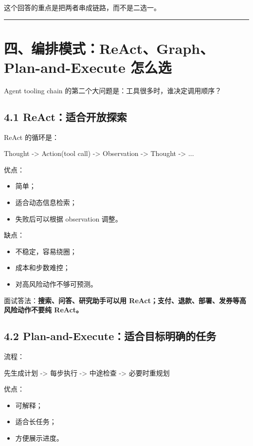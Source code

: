 这个回答的重点是把两者串成链路，而不是二选一。


\bigskip\hrule\bigskip

\section{四、编排模式：ReAct、Graph、Plan-and-Execute 怎么选}

Agent tooling chain 的第二个大问题是：工具很多时，谁决定调用顺序？


\subsection{4.1 ReAct：适合开放探索}

ReAct 的循环是：


\begin{codeblock}
Thought -> Action(tool call) -> Observation -> Thought -> ...
\end{codeblock}

优点：


\begin{itemize}[leftmargin=2em]
\item 简单；
\item 适合动态信息检索；
\item 失败后可以根据 observation 调整。
\end{itemize}

缺点：


\begin{itemize}[leftmargin=2em]
\item 不稳定，容易绕圈；
\item 成本和步数难控；
\item 对高风险动作不够可预测。
\end{itemize}

面试答法：\textbf{搜索、问答、研究助手可以用 ReAct；支付、退款、部署、发券等高风险动作不要纯 ReAct。}


\subsection{4.2 Plan-and-Execute：适合目标明确的任务}

流程：


\begin{codeblock}
先生成计划 -> 每步执行 -> 中途检查 -> 必要时重规划
\end{codeblock}

优点：


\begin{itemize}[leftmargin=2em]
\item 可解释；
\item 适合长任务；
\item 方便展示进度。
\end{itemize}

